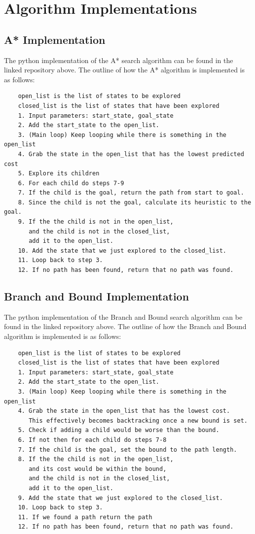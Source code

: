 \documentclass[12pt, letterpaper, final, onecolumn, titlepage] {article}
\begin{document}
\section{Algorithm Implementations}
\subsection{A* Implementation}
\noindent The python implementation of the A* search algorithm can be found in the linked repository above. The outline of how the A* algorithm is implemented is as follows:

\begin{verbatim}
    open_list is the list of states to be explored
    closed_list is the list of states that have been explored
    1. Input parameters: start_state, goal_state
    2. Add the start_state to the open_list.
    3. (Main loop) Keep looping while there is something in the open_list
    4. Grab the state in the open_list that has the lowest predicted cost
    5. Explore its children
    6. For each child do steps 7-9 
    7. If the child is the goal, return the path from start to goal.
    8. Since the child is not the goal, calculate its heuristic to the goal.
    9. If the the child is not in the open_list, 
       and the child is not in the closed_list, 
       add it to the open_list.
    10. Add the state that we just explored to the closed_list.
    11. Loop back to step 3.
    12. If no path has been found, return that no path was found.
\end{verbatim}

\newpage
\subsection{Branch and Bound Implementation}
The python implementation of the Branch and Bound search algorithm can be found in the linked repository above. The outline of how the Branch and Bound algorithm is implemented is as follows:

\begin{verbatim}
    open_list is the list of states to be explored
    closed_list is the list of states that have been explored
    1. Input parameters: start_state, goal_state
    2. Add the start_state to the open_list.
    3. (Main loop) Keep looping while there is something in the open_list
    4. Grab the state in the open_list that has the lowest cost.
       This effectively becomes backtracking once a new bound is set.
    5. Check if adding a child would be worse than the bound.
    6. If not then for each child do steps 7-8 
    7. If the child is the goal, set the bound to the path length.
    8. If the the child is not in the open_list,
       and its cost would be within the bound, 
       and the child is not in the closed_list, 
       add it to the open_list.
    9. Add the state that we just explored to the closed_list.
    10. Loop back to step 3.
    11. If we found a path return the path
    12. If no path has been found, return that no path was found.
\end{verbatim}
\newpage
\end{document}
